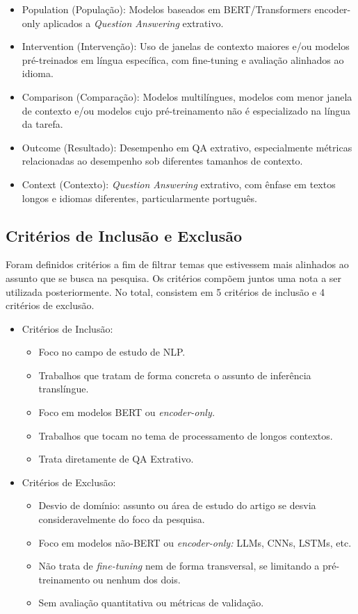 \documentclass[12pt,a4paper]{article}
\begin{document}
\begin{itemize}
    \item Population (População): Modelos baseados em BERT/Transformers encoder-only aplicados a \textit{Question Answering} extrativo.
    \item Intervention (Intervenção): Uso de janelas de contexto maiores e/ou modelos pré-treinados em língua específica, com fine-tuning e avaliação alinhados ao idioma.
    \item Comparison (Comparação): Modelos multilíngues, modelos com menor janela de contexto e/ou modelos cujo pré-treinamento não é especializado na língua da tarefa.
    \item Outcome (Resultado): Desempenho em QA extrativo, especialmente métricas relacionadas ao desempenho sob diferentes tamanhos de contexto.
    \item Context (Contexto): \textit{Question Answering} extrativo, com ênfase em textos longos e idiomas diferentes, particularmente português.
\end{itemize}

\subsection{Critérios de Inclusão e Exclusão}
Foram definidos critérios a fim de filtrar temas que estivessem mais alinhados ao assunto que se busca na pesquisa. Os critérios compõem juntos uma nota a ser utilizada posteriormente. No total, consistem em 5 critérios de inclusão e 4 critérios de exclusão.

\begin{itemize}
    \item Critérios de Inclusão:
    \begin{itemize}
        \item Foco no campo de estudo de NLP.
        \item Trabalhos que tratam de forma concreta o assunto de inferência translíngue.
        \item Foco em modelos BERT ou \textit{encoder-only.}
        \item Trabalhos que tocam no tema de processamento de longos contextos.
        \item Trata diretamente de QA Extrativo.
    \end{itemize}
    \item Critérios de Exclusão:
    \begin{itemize}
        \item Desvio de domínio: assunto ou área de estudo do artigo se desvia consideravelmente do foco da pesquisa.
        \item Foco em modelos não-BERT ou \textit{encoder-only:} LLMs, CNNs, LSTMs, etc.
        \item Não trata de \textit{fine-tuning} nem de forma transversal, se limitando a pré-treinamento ou nenhum dos dois.
        \item Sem avaliação quantitativa ou métricas de validação.
    \end{itemize}
\end{itemize}
\end{document}
